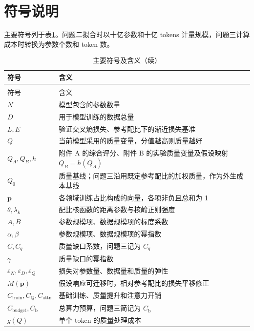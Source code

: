 \section{符号说明}

主要符号列于表\ref{tab:符号说明}。问题二拟合时以十亿参数和十亿 tokens 计量规模，问题三计算成本时转换为参数个数和 token 数。

\begingroup
{}
\setlength{\tabcolsep}{3pt}
\renewcommand{\arraystretch}{1.10}
\begin{longtable}{@{}>{\centering\arraybackslash}p{}>{\raggedright\arraybackslash}p{}@{}}
\caption{主要符号及含义}\label{tab:符号说明}\\
\toprule
符号 & 含义\\
\midrule
\endfirsthead
\caption{主要符号及含义（续）}\\
\toprule
符号 & 含义\\
\midrule
\endhead
\bottomrule
\endfoot
$N$ & 模型包含的参数数量\\
$D$ & 用于模型训练的数据总量\\
$L,E$ & 验证交叉熵损失、参考配比下的渐近损失基准\\
$Q$ & 当前模型采用的质量变量，分值越高则质量越好\\
$Q_A,Q_B,h$ & 附件 A 的综合评分、附件 B 的实验质量变量及假设映射 $Q_B=h(Q_A)$\\
$Q_0$ & 质量基线；问题三沿用既定参考配比的加权质量，作为外生成本基线\\
$\bm p$ & 各领域训练占比构成的向量，各项非负且总和为 1\\
$\theta,\lambda_k$ & 配比核函数的距离参数与核岭正则强度\\
$A,B$ & 参数规模项、数据规模项的标度系数\\
$\alpha,\beta$ & 参数规模项、数据规模项的幂指数\\
$C,C_q$ & 质量缺口系数，问题三记为 $C_q$\\
$\gamma$ & 质量缺口的幂指数\\
$\varepsilon_N,\varepsilon_D,\varepsilon_Q$ & 损失对参数量、数据量和质量的弹性\\
$M(\bm p)$ & 假设响应可迁移时，相对参考配比的损失平移修正\\
$C_{\text{train}},C_Q,C_{\text{attn}}$ & 基础训练、质量提升和注意力开销\\
$C_{\text{budget}},C_{\mathrm b}$ & 总算力预算，问题三简记为 $C_{\mathrm b}$\\
$g(Q)$ & 单个 token 的质量处理成本\\

\end{longtable}
